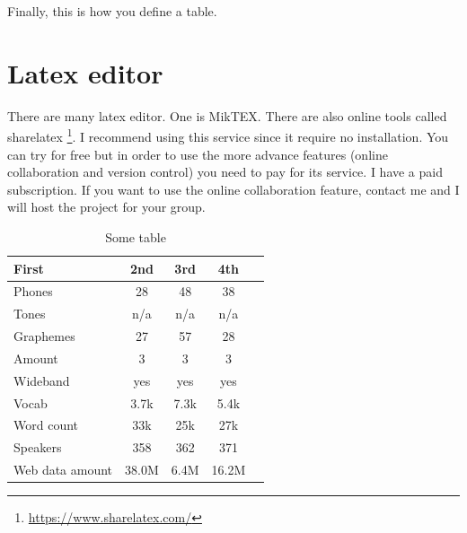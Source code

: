 \documentclass{article}
\begin{document}
Finally, this is how you define a table.

\section{Latex editor}

There are many latex editor. One is MikTEX. There are also online tools called sharelatex \footnote{\url{https://www.sharelatex.com/}}. I recommend using this service since it require no installation. You can try for free but in order to use the more advance features (online collaboration and version control) you need to pay for its service. I have a paid subscription. If you want to use the online collaboration feature, contact me and I will host the project for your group.

\begin{table}
\centering
\begin{tabular}{|l|c|c|c|c|} %
 \hline %
First & 2nd & 3rd & 4th \\ %
 \hline
 Phones & 28 & 48 & 38 \\
 Tones & n/a & n/a & n/a \\
 Graphemes & 27 & 57 & 28 \\
 Amount & 3 & 3 & 3 \\
 Wideband & yes & yes & yes \\
 Vocab & 3.7k & 7.3k & 5.4k \\
 Word count & 33k & 25k & 27k \\
 Speakers & 358 & 362 & 371 \\
 Web data amount & 38.0M & 6.4M & 16.2M \\
 \hline
\end{tabular}
\caption{Some table}
\label{tab:table}
\end{table}



\end{document}
